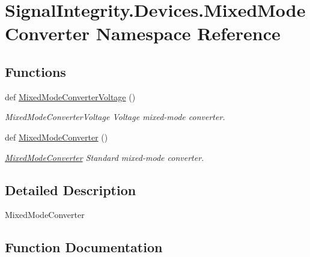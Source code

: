 \hypertarget{namespaceSignalIntegrity_1_1Devices_1_1MixedModeConverter}{}\section{Signal\+Integrity.\+Devices.\+Mixed\+Mode\+Converter Namespace Reference}
\label{namespaceSignalIntegrity_1_1Devices_1_1MixedModeConverter}
\subsection*{Functions}
\begin{DoxyCompactItemize}
\item 
def \hyperlink{namespaceSignalIntegrity_1_1Devices_1_1MixedModeConverter_a373cd4a14b6f9ea44be46f2ded959e64}{Mixed\+Mode\+Converter\+Voltage} ()
\begin{DoxyCompactList}\small\item\em Mixed\+Mode\+Converter\+Voltage Voltage mixed-\/mode converter. \end{DoxyCompactList}\item 
def \hyperlink{namespaceSignalIntegrity_1_1Devices_1_1MixedModeConverter_a53985f71dfdd054f0743e312a27eaa30}{Mixed\+Mode\+Converter} ()
\begin{DoxyCompactList}\small\item\em \hyperlink{namespaceSignalIntegrity_1_1Devices_1_1MixedModeConverter}{Mixed\+Mode\+Converter} Standard mixed-\/mode converter. \end{DoxyCompactList}\end{DoxyCompactItemize}


\subsection{Detailed Description}
\begin{DoxyVerb}MixedModeConverter\end{DoxyVerb}
 

\subsection{Function Documentation}
\mbox{\label{namespaceSignalIntegrity_1_1Devices_1_1MixedModeConverter_a53985f71dfdd054f0743e312a27eaa30}} 

